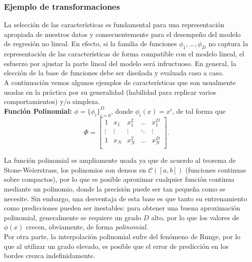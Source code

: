 \subsubsection{Ejemplo de transformaciones}

La selección de las características es fundamental para una representación apropiada de nuestros datos y consecuentemente para el desempeño del modelo de regresión no lineal. En efecto, si la familia de funciones $\phi_1,\ldots,\phi_D$ no captura la representación de las características de forma compatible con el modelo lineal, el esfuerzo por ajustar la parte lineal del modelo será infructuoso. En general, la elección de la base de funciones debe ser diseñada y evaluada caso a caso.\\

A continuación vemos algunos ejemplos de características que son usualmente usadas en la práctica por su generalidad (habilidad para replicar varios comportamientos) y/o simpleza.\\

\noindent\textbf{Función Polinomial:} $\phi=\{\phi_i\}_{i=0}^D$, donde $\phi_i(x)=x^i$, de tal forma que 
\begin{equation}
    \Phi = \left[ \begin{matrix} 1 & x_1 & x_1^2 & \ldots & x_1^D\\
    \vdots & \vdots & \vdots & \ddots & \vdots \\
    1 & x_N & x_N^2 & \ldots & x_N^D\\
    \end{matrix} \right].
\end{equation}

La función polinomial es ampliamente usada ya que de acuerdo al teorema de Stone-Weierstrass, los polinomios son densos en $\mathcal{C}([a,b])$ (funciones continuas sobre compactos), por lo que es posible aproximar cualquier función continua mediante un polinomio, donde la precisión puede ser tan pequeña como se necesite. Sin embargo, una desventaja de esta  base es que tanto su entrenamiento como  predicciones pueden ser inestables: para obtener una buena aproximación polinomial, generalmente se requiere un grado $D$  alto, por lo que los valores de $\phi(x)$ crecen, obviamente, de forma \emph{polinomial}.\\

Por otra parte, la interpolación polinomial sufre del fenómeno de Runge, por lo que al utilizar un grado elevado, es posible que el error de predicción en los bordes crezca indefinidamente.\\

